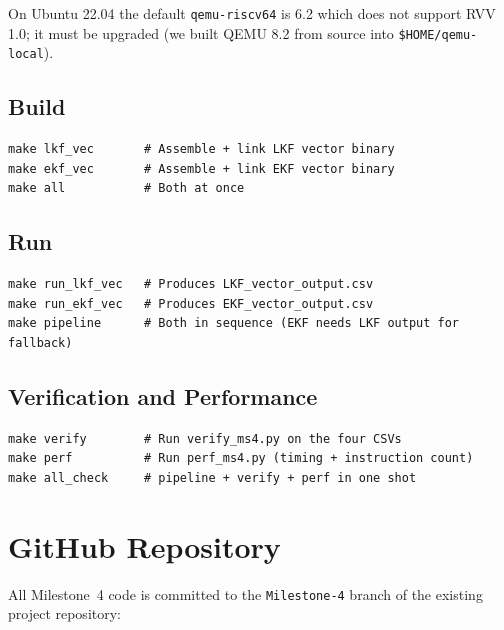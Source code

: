 \documentclass[11pt,a4paper]{article}
\begin{document}
On Ubuntu 22.04 the default \texttt{qemu-riscv64} is 6.2 which does not
support RVV 1.0; it must be upgraded (we built QEMU 8.2 from source into
\texttt{\$HOME/qemu-local}).

\subsection{Build}

\begin{lstlisting}[caption={Build commands. The Makefile cross-compiles assembly + C helper, links statically.}]
make lkf_vec       # Assemble + link LKF vector binary
make ekf_vec       # Assemble + link EKF vector binary
make all           # Both at once
\end{lstlisting}

\subsection{Run}

\begin{lstlisting}[caption={Run commands. QEMU invocation enables the V extension at VLEN=128.}]
make run_lkf_vec   # Produces LKF_vector_output.csv
make run_ekf_vec   # Produces EKF_vector_output.csv
make pipeline      # Both in sequence (EKF needs LKF output for fallback)
\end{lstlisting}

\subsection{Verification and Performance}

\begin{lstlisting}[caption={Verification and performance commands. Both write console output and an optional report file.}]
make verify        # Run verify_ms4.py on the four CSVs
make perf          # Run perf_ms4.py (timing + instruction count)
make all_check     # pipeline + verify + perf in one shot
\end{lstlisting}

\section{GitHub Repository}

All Milestone~4 code is committed to the \texttt{Milestone-4} branch of the
existing project repository:
\end{document}
